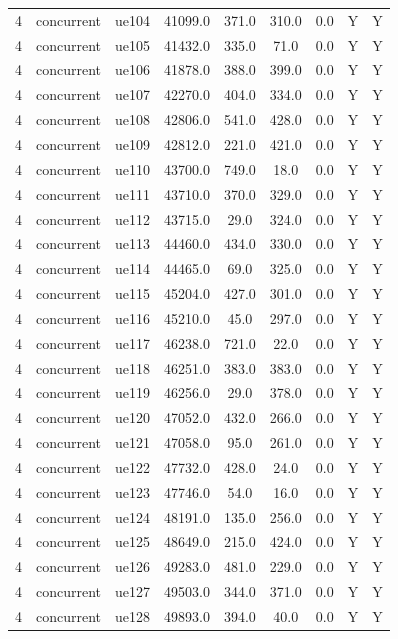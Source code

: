 \begin{table}[ht]
\begin{tabular}{|c|c|c|c|c|c|c|c|c|}
4 & concurrent & ue104 & 41099.0 & 371.0 & 310.0 & 0.0 & Y & Y \\
4 & concurrent & ue105 & 41432.0 & 335.0 & 71.0 & 0.0 & Y & Y \\
4 & concurrent & ue106 & 41878.0 & 388.0 & 399.0 & 0.0 & Y & Y \\
4 & concurrent & ue107 & 42270.0 & 404.0 & 334.0 & 0.0 & Y & Y \\
4 & concurrent & ue108 & 42806.0 & 541.0 & 428.0 & 0.0 & Y & Y \\
4 & concurrent & ue109 & 42812.0 & 221.0 & 421.0 & 0.0 & Y & Y \\
4 & concurrent & ue110 & 43700.0 & 749.0 & 18.0 & 0.0 & Y & Y \\
4 & concurrent & ue111 & 43710.0 & 370.0 & 329.0 & 0.0 & Y & Y \\
4 & concurrent & ue112 & 43715.0 & 29.0 & 324.0 & 0.0 & Y & Y \\
4 & concurrent & ue113 & 44460.0 & 434.0 & 330.0 & 0.0 & Y & Y \\
4 & concurrent & ue114 & 44465.0 & 69.0 & 325.0 & 0.0 & Y & Y \\
4 & concurrent & ue115 & 45204.0 & 427.0 & 301.0 & 0.0 & Y & Y \\
4 & concurrent & ue116 & 45210.0 & 45.0 & 297.0 & 0.0 & Y & Y \\
4 & concurrent & ue117 & 46238.0 & 721.0 & 22.0 & 0.0 & Y & Y \\
4 & concurrent & ue118 & 46251.0 & 383.0 & 383.0 & 0.0 & Y & Y \\
4 & concurrent & ue119 & 46256.0 & 29.0 & 378.0 & 0.0 & Y & Y \\
4 & concurrent & ue120 & 47052.0 & 432.0 & 266.0 & 0.0 & Y & Y \\
4 & concurrent & ue121 & 47058.0 & 95.0 & 261.0 & 0.0 & Y & Y \\
4 & concurrent & ue122 & 47732.0 & 428.0 & 24.0 & 0.0 & Y & Y \\
4 & concurrent & ue123 & 47746.0 & 54.0 & 16.0 & 0.0 & Y & Y \\
4 & concurrent & ue124 & 48191.0 & 135.0 & 256.0 & 0.0 & Y & Y \\
4 & concurrent & ue125 & 48649.0 & 215.0 & 424.0 & 0.0 & Y & Y \\
4 & concurrent & ue126 & 49283.0 & 481.0 & 229.0 & 0.0 & Y & Y \\
4 & concurrent & ue127 & 49503.0 & 344.0 & 371.0 & 0.0 & Y & Y \\
4 & concurrent & ue128 & 49893.0 & 394.0 & 40.0 & 0.0 & Y & Y \\

\end{tabular}
\end{table}
